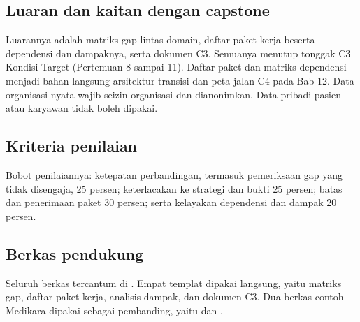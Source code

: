 \subsection*{Luaran dan kaitan dengan capstone}

Luarannya adalah matriks gap lintas domain, daftar paket kerja beserta dependensi dan dampaknya, serta dokumen C3. Semuanya menutup tonggak C3 Kondisi Target (Pertemuan 8 sampai 11). Daftar
paket dan matriks dependensi menjadi bahan langsung arsitektur transisi dan peta jalan C4 pada Bab 12. Data organisasi nyata wajib seizin organisasi dan dianonimkan. Data pribadi pasien atau
karyawan tidak boleh dipakai.

\subsection*{Kriteria penilaian}

Bobot penilaiannya: ketepatan perbandingan, termasuk pemeriksaan gap yang tidak disengaja, 25 persen;
keterlacakan ke strategi dan bukti 25 persen; batas dan penerimaan paket 30 persen; serta kelayakan
dependensi dan dampak 20 persen.

\subsection*{Berkas pendukung}

Seluruh berkas tercantum di . Empat templat dipakai langsung, yaitu
matriks gap, daftar paket kerja, analisis dampak, dan dokumen C3. Dua berkas contoh Medikara dipakai sebagai
pembanding, yaitu  dan
.

